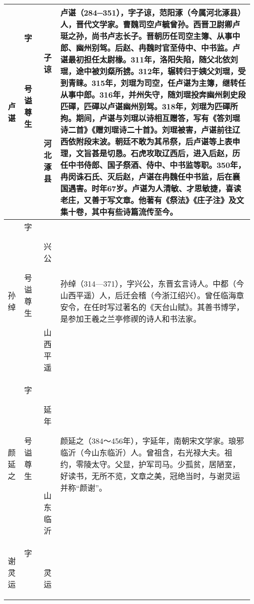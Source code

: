 \begin{longtable}{|>{\centering\namefont\heiti}m{2em}|>{\centering\tiny}m{3.0em}|>{\xzfont\kaiti}m{7em}|}
  卢谌 & \begin{description}
  \item[字] 子谅
  \item[号] 
  \item[谥] 
  \item[尊] 
  \item[生] 河北涿县
  \end{description} & 卢谌（284─351），字子谅，范阳涿（今属河北涿县）人，晋代文学家。曹魏司空卢毓曾孙。西晋卫尉卿卢珽之孙，尚书卢志长子。晋朝历任司空主簿、从事中郎、幽州别驾。后赵、冉魏时官至侍中、中书监。卢谌最初担任太尉椽。311年，洛阳失陷，随父北依刘琨，途中被刘粲所掳。312年，辗转归于姨父刘琨，受到青睐。315年，刘琨为司空，任卢谌为主簿，继转任从事中郎。316年，并州失守，随刘琨投奔幽州刺史段匹磾，匹磾以卢谌幽州别驾。318年，刘琨为匹磾所拘。期间，卢谌与刘琨以诗相互赠答，写有《答刘琨诗二首》《赠刘琨诗二十首》。刘琨被害，卢谌前往辽西依附段末波。朝廷不敢为其吊祭，后卢谌等上表申理，文旨甚是切恳。石虎攻取辽西后，进入后赵，历任中书侍郎、国子祭酒、侍中、中书监等职。350年，冉闵诛石氏、灭后赵，卢谌在冉魏任中书监，后在襄国遇害。时年67岁。卢谌为人清敏、才思敏捷，喜读老庄，又善于写文章。他著有《祭法》《庄子注》及文集十卷，其中有些诗篇流传至今。 \tabularnewline\hline
  孙绰 & \begin{description}
  \item[字] 兴公
  \item[号] 
  \item[谥] 
  \item[尊] 
  \item[生] 山西平遥
  \end{description} & 孙绰（314—371），字兴公，东晋玄言诗人。中都（今山西平遥）人，后迁会稽（今浙江绍兴）。曾任临海章安令，在任时写过著名的《天台山赋》。其善书博学，是参加王羲之兰亭修禊的诗人和书法家。 \tabularnewline\hline
    颜延之 & \begin{description}
    \item[字] 延年
    \item[号] 
    \item[谥] 
    \item[尊] 
    \item[生] 山东临沂
    \end{description} & 颜延之（384～456年），字延年，南朝宋文学家。琅邪临沂（今山东临沂）人。曾祖含，右光禄大夫。祖约，零陵太守。父显，护军司马。少孤贫，居陋室，好读书，无所不览，文章之美，冠绝当时，与谢灵运并称“颜谢”。 \tabularnewline\hline
    谢灵运 & \begin{description}
    \item[字] 灵运

\end{description}
\end{longtable}
